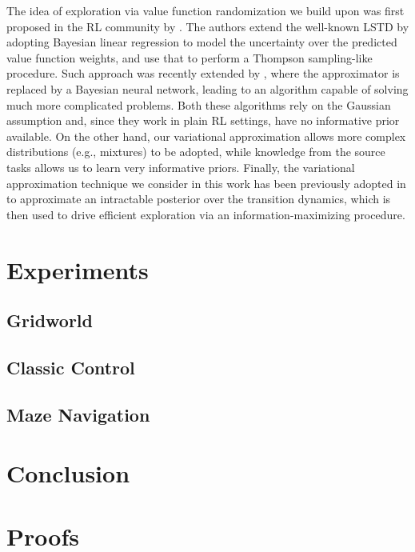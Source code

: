 \documentclass{article}
\begin{document}

The idea of exploration via value function randomization we build upon was first proposed in the RL community by \cite{}. The authors extend the well-known LSTD \cite{} by adopting Bayesian linear regression to model the uncertainty over the predicted value function weights, and use that to perform a Thompson sampling-like procedure. Such approach was recently extended by \cite{}, where the approximator is replaced by a Bayesian neural network, leading to an algorithm capable of solving much more complicated problems. Both these algorithms rely on the Gaussian assumption and, since they work in plain RL settings, have no informative prior available. On the other hand, our variational approximation allows more complex distributions (e.g., mixtures) to be adopted, while knowledge from the source tasks allows us to learn very informative priors. Finally, the variational approximation technique we consider in this work has been previously adopted in \cite{} to approximate an intractable posterior over the transition dynamics, which is then used to drive efficient exploration via an information-maximizing procedure.

\section{Experiments}

\subsection{Gridworld}

\subsection{Classic Control}

\subsection{Maze Navigation}

\section{Conclusion}

{\small 


}

\newpage
\appendix

\section{Proofs}
\end{document}
